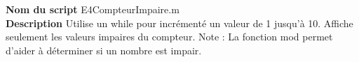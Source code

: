 \textbf{Nom du script}
E4CompteurImpaire.m\\
\textbf{Description}
Utilise un while pour incrémenté un valeur de 1 jusqu'à 10. Affiche seulement les valeurs impaires du compteur. Note : La fonction mod permet d'aider à déterminer si un nombre est impair.